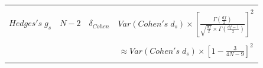 \documentclass[
  man,floatsintext]{apa6}
\begin{document}
\begin{landscape}
\begin{longtable}[]{@{}lccc@{}}
\begin{minipage}[t]{0.42\columnwidth}
\strut
\end{minipage}\tabularnewline
\begin{minipage}[t]{0.12\columnwidth}\raggedright
\(Hedges's \; g_s\)\strut
\end{minipage} & \begin{minipage}[t]{0.11\columnwidth}\centering
\(N-2\)\strut
\end{minipage} & \begin{minipage}[t]{0.24\columnwidth}\centering
\(\delta_{Cohen}\)\strut
\end{minipage} & \begin{minipage}[t]{0.42\columnwidth}\centering
\(Var(Cohen's \; d_s) \times \left[ \frac{\Gamma(\frac{df}{2})}{\sqrt{\frac{df}{2}} \times \Gamma(\frac{df-1}{2})} \right]^2\)\strut
\end{minipage}\tabularnewline
\begin{minipage}[t]{0.12\columnwidth}\raggedright
\strut
\end{minipage} & \begin{minipage}[t]{0.11\columnwidth}\centering
\strut
\end{minipage} & \begin{minipage}[t]{0.24\columnwidth}\centering
\strut
\end{minipage} & \begin{minipage}[t]{0.42\columnwidth}\centering
\strut
\end{minipage}\tabularnewline
\begin{minipage}[t]{0.12\columnwidth}\raggedright
\strut
\end{minipage} & \begin{minipage}[t]{0.11\columnwidth}\centering
\strut
\end{minipage} & \begin{minipage}[t]{0.24\columnwidth}\centering
\strut
\end{minipage} & \begin{minipage}[t]{0.42\columnwidth}\centering
\(\approx Var(Cohen's \; d_s) \times \left[1-\frac{3}{4N-9}\right]^2\)\strut
\end{minipage}\tabularnewline
\begin{minipage}[t]{0.12\columnwidth}\raggedright
\strut
\end{minipage} & \begin{minipage}[t]{0.11\columnwidth}\centering
\strut
\end{minipage} & \begin{minipage}[t]{0.24\columnwidth}\centering
\strut
\end{minipage} & \begin{minipage}[t]{0.42\columnwidth}\centering
\strut
\end{minipage}\tabularnewline
\bottomrule
\end{longtable}


\end{landscape}
\end{document}
